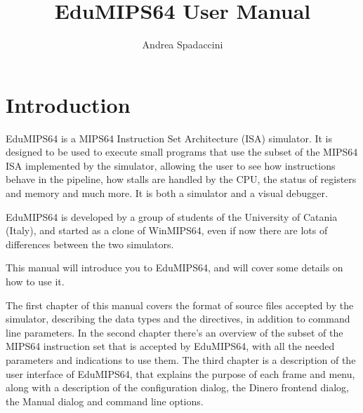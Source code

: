 \documentclass[12pt]{report}
\author{Andrea Spadaccini}
\title{EduMIPS64 \EV User Manual}
\newcommand{\EM}{EduMIPS64}
\newcommand{\MS}{MIPS64}
\begin{document}
\setlength{\baselineskip}{1.60\baselineskip} %

\newlength{\centeroffset}
\setlength{\centeroffset}{-0.5\oddsidemargin}
\addtolength{\centeroffset}{0.5\evensidemargin}
\thispagestyle{empty}
\noindent\hspace*{\centeroffset}

\noindent\hspace*{\centeroffset}



\pagebreak

\tableofcontents
\listoftables
\lstlistoflistings
\chapter*{Introduction}
\EM{} is a \MS{} Instruction Set Architecture (ISA) simulator. It is designed to
be used to execute small programs that use the subset of the \MS{} ISA
implemented by the simulator, allowing the user to see how instructions behave
in the pipeline, how stalls are handled by the CPU, the status of registers and
memory and much more. It is both a simulator and a visual debugger.

\EM{} is developed by a group of students of the University of Catania (Italy),
and started as a clone of WinMIPS64, even if now there are lots of differences
between the two simulators.

This manual will introduce you to \EM{}, and will cover some details on how to
use it.

The first chapter of this manual covers the format of source files accepted by
the simulator, describing the data types and the directives, in addition to
command line parameters. In the second chapter there's an overview of the subset
of the \MS{} instruction set that is accepted by \EM{}, with all the needed
parameters and indications to use them. The third chapter is a description of
the user interface of \EM{}, that explains the purpose of each frame and menu,
along with a description of the configuration dialog, the Dinero frontend
dialog, the Manual dialog and command line options. 
\end{document}
